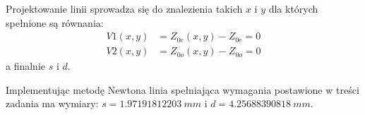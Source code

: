 \documentclass[rep.tex]{subfiles}
\begin{document}
Projektowanie linii sprowadza się do znalezienia takich $x$ i $y$ dla których spełnione są równania:
\begin{align}
  V1(x, y) &= Z_{0e}(x, y) - Z_{0e} = 0 \\
  V2(x, y) &= Z_{0o}(x, y) - Z_{0o} = 0
\end{align}
a finalnie $s$ i $d$.

Implementując metodę Newtona linia spełniająca wymagania postawione w treści zadania ma wymiary: $s = 1.97191812203~mm$ i $d = 4.25688390818~mm$.
\end{document}
